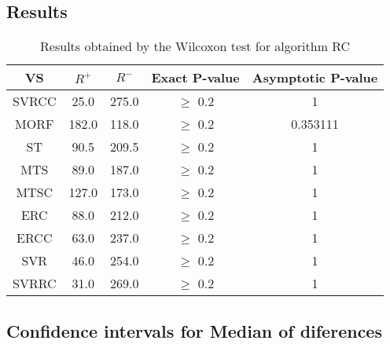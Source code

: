 \documentclass[a4paper,10pt]{article}
\begin{document}
\subsection{Results}

\begin{table}[!htp]
\centering\small
\begin{tabular}{
|c|c|c|c|c|}
\hline
 VS & $R^{+}$ & $R^{-}$ & Exact P-value & Asymptotic P-value \\ \hline 
SVRCC & 25.0 & 275.0 & $\geq$ 0.2 & 1\\ \hline 
MORF & 182.0 & 118.0 & $\geq$ 0.2 & 0.353111\\ \hline 
ST & 90.5 & 209.5 & $\geq$ 0.2 & 1\\ \hline 
MTS & 89.0 & 187.0 & $\geq$ 0.2 & 1\\ \hline 
MTSC & 127.0 & 173.0 & $\geq$ 0.2 & 1\\ \hline 
ERC & 88.0 & 212.0 & $\geq$ 0.2 & 1\\ \hline 
ERCC & 63.0 & 237.0 & $\geq$ 0.2 & 1\\ \hline 
SVR & 46.0 & 254.0 & $\geq$ 0.2 & 1\\ \hline 
SVRRC & 31.0 & 269.0 & $\geq$ 0.2 & 1\\ \hline 

\end{tabular}
\caption{Results obtained by the Wilcoxon test for algorithm RC}
\end{table}

\subsection{Confidence intervals for Median of diferences}
\end{document}
